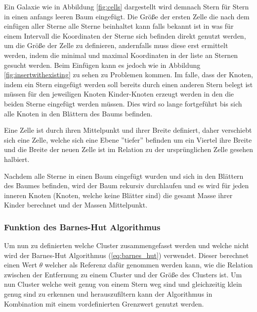 \par Ein Galaxie wie in Abbildung \ref{fig:cells} dargestellt wird demnach
Stern für Stern in einen anfangs leeren Baum eingefügt. Die Größe der ersten
Zelle die nach dem einfügen aller Sterne alle Sterne beinhaltet kann falls
bekannt ist in was für einem Intervall die Koordinaten der Sterne sich befinden
direkt genutzt werden, um die Größe der Zelle zu definieren, andernfalls muss
diese erst ermittelt werden, indem die minimal und maximal Koordinaten in der
liste an Sternen gesucht werden. Beim Einfügen kann es jedoch wie in Abbildung
\ref{fig:insertwithexisting} zu sehen zu Problemen kommen. Im falle, dass der
Knoten, indem ein Stern eingefügt werden soll bereits durch einen anderen Stern
belegt ist müssen für den jeweiligen Knoten Kinder-Knoten erzeugt werden in den
die beiden Sterne eingefügt werden müssen. Dies wird so lange fortgeführt bis
sich alle Knoten in den Blättern des Baums befinden.

\par Eine Zelle ist durch ihren Mittelpunkt und ihrer Breite definiert, daher
verschiebt sich eine Zelle, welche sich eine Ebene ''tiefer'' befinden um ein
Viertel ihre Breite und die Breite der neuen Zelle ist im Relation zu der
ursprünglichen Zelle gesehen halbiert.

\par Nachdem alle Sterne in einen Baum eingefügt wurden und sich in den
Blättern des Baumes befinden, wird der Baum rekursiv durchlaufen und es wird
für jeden inneren Knoten (Knoten, welche keine Blätter sind) die gesamt Masse
ihrer Kinder berechnet und der Massen Mittelpunkt.

\subsubsection{Funktion des Barnes-Hut Algorithmus}

Um nun zu definierten welche Cluster zusammengefasst werden und welche nicht
wird der Barnes-Hut Algorithmus (\ref{eq:barnes_hut}) verwendet. Dieser
berechnet einen Wert \( \theta \) welcher als Referenz dafür genommen werden
kann, wie die Relation zwischen der Entfernung zu einem Cluster und der Größe
des Clusters ist. Um nun Cluster welche weit genug von einem Stern weg sind und
gleichzeitig klein genug sind zu erkennen und herauszufiltern kann der
Algorithmus in Kombination mit einem vordefinierten Grenzwert genutzt werden.

